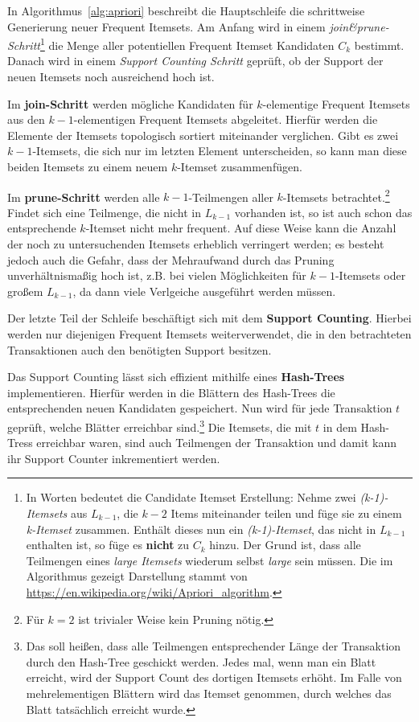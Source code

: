 In Algorithmus~\ref{alg:apriori} beschreibt die Hauptschleife die schrittweise 
Generierung neuer Frequent Itemsets. Am Anfang wird in einem
\textit{join\&prune-Schritt}\footnote{In Worten bedeutet die Candidate
Itemset Erstellung: Nehme zwei \textit{(k-1)-Itemsets} aus \(L_{k-1}\), die \(k-2\) Items
miteinander teilen und füge sie zu einem \textit{k-Itemset} zusammen. Enthält dieses
nun ein \textit{(k-1)-Itemset}, das nicht in \(L_{k-1}\) enthalten ist, so füge es 
\textbf{nicht} zu \(C_k\) hinzu. Der Grund ist, dass alle Teilmengen eines 
\textit{large Itemsets} wiederum selbst \textit{large} sein müssen. Die im 
Algorithmus gezeigt Darstellung stammt von 
\url{https://en.wikipedia.org/wiki/Apriori\_algorithm}. }
die Menge aller potentiellen Frequent Itemset Kandidaten \(C_k\) bestimmt.
Danach wird in einem \textit{Support Counting Schritt} geprüft, ob der Support
der neuen Itemsets noch ausreichend hoch ist.

Im \textbf{join-Schritt} werden mögliche Kandidaten für \(k\)-elementige Frequent Itemsets
aus den \(k-1\)-elementigen Frequent Itemsets abgeleitet. Hierfür werden die
Elemente der Itemsets topologisch sortiert miteinander verglichen. Gibt es 
zwei \(k-1\)-Itemsets, die sich nur im letzten Element unterscheiden, so kann man 
diese beiden Itemsets zu einem neuem \(k\)-Itemset zusammenfügen.

Im \textbf{prune-Schritt} werden alle \(k-1\)-Teilmengen aller \(k\)-Itemsets
betrachtet.\footnote{Für \(k=2\) ist trivialer Weise kein Pruning nötig.}
Findet sich eine Teilmenge, die nicht in \(L_{k-1}\) vorhanden ist, so ist auch schon
das entsprechende \(k\)-Itemset nicht mehr frequent. Auf diese Weise kann die Anzahl
der noch zu untersuchenden Itemsets erheblich verringert werden; es besteht jedoch
auch die Gefahr, dass der Mehraufwand durch das Pruning unverhältnismaßig hoch
ist, z.B. bei vielen Möglichkeiten für \(k-1\)-Itemsets oder großem \(L_{k-1}\),
da dann viele Verlgeiche ausgeführt werden müssen.

Der letzte Teil der Schleife beschäftigt sich mit dem \textbf{Support Counting}.
Hierbei werden nur diejenigen Frequent Itemsets weiterverwendet, die in den
betrachteten Transaktionen auch den benötigten Support besitzen.

Das Support Counting lässt sich effizient mithilfe eines \textbf{Hash-Trees} implementieren.
Hierfür werden in die Blättern des Hash-Trees die entsprechenden neuen
Kandidaten gespeichert. Nun wird für jede Transaktion \(t\) geprüft, welche
Blätter erreichbar sind.\footnote{Das soll heißen, dass alle Teilmengen entsprechender Länge
der Transaktion durch den Hash-Tree geschickt werden. Jedes mal, wenn man ein Blatt erreicht,
wird der Support Count des dortigen Itemsets erhöht. Im Falle von mehrelementigen Blättern wird
das Itemset genommen, durch welches das Blatt tatsächlich erreicht wurde.}
Die Itemsets, die mit \(t\) in dem Hash-Tress erreichbar waren, sind auch Teilmengen
der Transaktion und damit kann ihr Support Counter inkrementiert werden.

